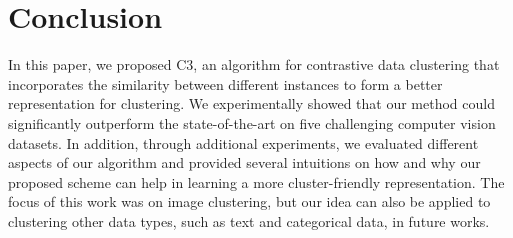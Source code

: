 \documentclass{bmvc2k}
\begin{document}
\section{Conclusion}
\vspace{-3mm}
In this paper, we proposed C3, an algorithm for contrastive data clustering that incorporates the similarity between different instances to form a better representation for clustering. We experimentally showed that our method could significantly outperform the state-of-the-art on five challenging computer vision datasets. In addition, through additional experiments, we evaluated different aspects of our algorithm and provided several intuitions on how and why our proposed scheme can help in learning a more cluster-friendly representation. The focus of this work was on image clustering, but our idea can also be applied to clustering other data types, such as text and categorical data, in future works.




\end{document}
